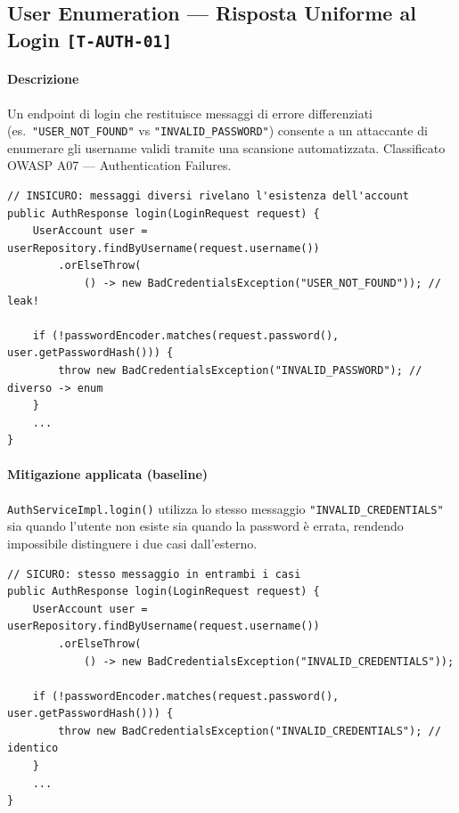 ﻿\documentclass[a4paper,12pt]{report}
\newcommand{\threat}[1]{\texttt{\small\textcolor{vulnred}{[#1]}}}
\begin{document}
\subsection{User Enumeration — Risposta Uniforme al Login \threat{T-AUTH-01}}

\paragraph{Descrizione}
Un endpoint di login che restituisce messaggi di errore differenziati (es.\
\texttt{"USER\_NOT\_FOUND"} vs \texttt{"INVALID\_PASSWORD"}) consente a un attaccante
di enumerare gli username validi tramite una scansione automatizzata.
Classificato OWASP A07 --- Authentication Failures.

\begin{insecurebox}[title={Pattern Vulnerabile Evitato --- AuthServiceImpl.java}]
\begin{lstlisting}[style=java]
// INSICURO: messaggi diversi rivelano l'esistenza dell'account
public AuthResponse login(LoginRequest request) {
    UserAccount user = userRepository.findByUsername(request.username())
        .orElseThrow(
            () -> new BadCredentialsException("USER_NOT_FOUND")); // leak!

    if (!passwordEncoder.matches(request.password(), user.getPasswordHash())) {
        throw new BadCredentialsException("INVALID_PASSWORD"); // diverso -> enum
    }
    ...
}
\end{lstlisting}
\end{insecurebox}

\paragraph{Mitigazione applicata (baseline)}
\texttt{AuthServiceImpl.login()} utilizza lo stesso messaggio \texttt{"INVALID\_CREDENTIALS"}
sia quando l'utente non esiste sia quando la password è errata, rendendo impossibile
distinguere i due casi dall'esterno.

\begin{securebox}[title={Codice Sicuro --- AuthServiceImpl.java (branch \texttt{main})}]
\begin{lstlisting}[style=java]
// SICURO: stesso messaggio in entrambi i casi
public AuthResponse login(LoginRequest request) {
    UserAccount user = userRepository.findByUsername(request.username())
        .orElseThrow(
            () -> new BadCredentialsException("INVALID_CREDENTIALS"));

    if (!passwordEncoder.matches(request.password(), user.getPasswordHash())) {
        throw new BadCredentialsException("INVALID_CREDENTIALS"); // identico
    }
    ...
}
\end{lstlisting}
\end{securebox}
\end{document}
